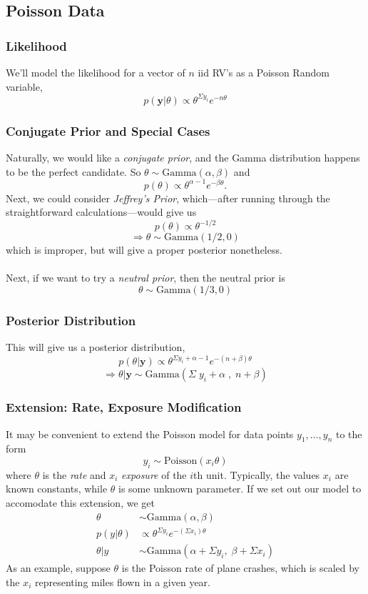 \documentclass[12pt]{article}
\begin{document}
\newpage
\subsection{Poisson Data}

\subsubsection{Likelihood}

We'll model the likelihood for a vector of $n$ iid RV's as a
Poisson Random variable,
   \[ p(\mathbf{y} | \theta) \propto \theta^{\Sigma y_i} e^{-n\theta} \]
   
\subsubsection{Conjugate Prior and Special Cases}

Naturally, we would like a \emph{conjugate prior}, and the Gamma 
distribution
happens to be the perfect candidate. 
So $\theta \sim \text{Gamma}(\alpha,
\beta)$ and
   \[ p(\theta) \propto \theta^{\alpha - 1} e^{-\beta \theta}.\]
Next, we could consider \emph{Jeffrey's Prior}, 
which---after running through
the straightforward calculations---would give us
   \[ p(\theta) \propto \theta^{-1/2} \]
   \[ \Rightarrow \theta \sim \text{Gamma}(1/2, 0) \]
which is improper, but will give a proper posterior nonetheless.
\\
\\
Next, if we want to try a \emph{neutral prior}, then the neutral prior
is
   \[ \theta \sim \text{Gamma}(1/3, 0) \]


\subsubsection{Posterior Distribution}

This will give us a posterior distribution,
   \[ p(\theta | \mathbf{y}) \propto \theta^{ \Sigma y_i + \alpha
      - 1} e^{-(n+ \beta) \theta} \]
   \[ \Rightarrow \theta | \mathbf{y} \sim \text{Gamma}( \Sigma \; y_i
      + \alpha \; , \; n + \beta ) \]


\subsubsection{Extension: Rate, Exposure Modification} 
It may be convenient to extend
the Poisson model for data points $y_1, \ldots, y_n$ to the form
   \[ y_i \sim \text{Poisson}(x_i\theta) \]
where $\theta$ is the \emph{rate} and $x_i$ \emph{exposure} of the 
$i$th unit. Typically, the values $x_i$ are known constants, while
$\theta$ is some unknown parameter. If we set out our model to 
accomodate this extension, we get
\begin{align*}
   \theta &\sim \text{Gamma}(\alpha, \beta) \\
   p(y|\theta) &\propto \theta^{\Sigma y_i} e^{-(\Sigma x_i)\theta}\\
   \theta | y &\sim \text{Gamma}\left( \alpha + \Sigma y_i, \; 
      \beta + \Sigma x_i\right)
\end{align*}
As an example, suppose $\theta$ is the Poisson rate of plane crashes,
which is scaled by the $x_i$ representing miles flown in a given year.
\end{document}
